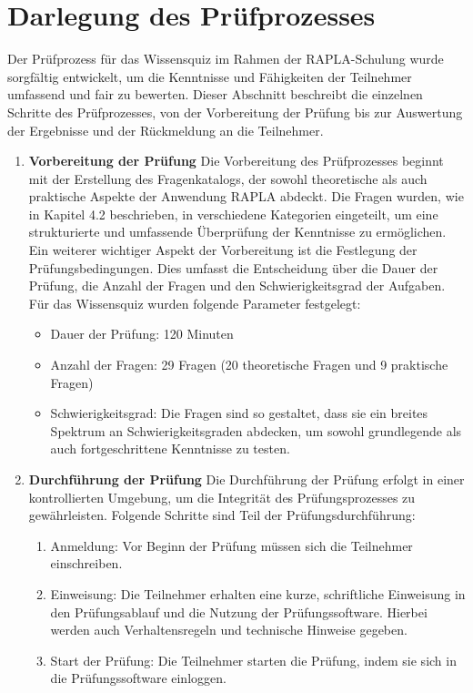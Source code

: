 \section{Darlegung des Prüfprozesses}
Der Prüfprozess für das Wissensquiz im Rahmen der RAPLA-Schulung wurde sorgfältig entwickelt, um die Kenntnisse und Fähigkeiten der Teilnehmer umfassend und fair zu bewerten. Dieser Abschnitt beschreibt die einzelnen Schritte des Prüfprozesses, von der Vorbereitung der Prüfung bis zur Auswertung der Ergebnisse und der Rückmeldung an die Teilnehmer.
\begin{enumerate}
    \item \textbf{Vorbereitung der Prüfung}
Die Vorbereitung des Prüfprozesses beginnt mit der Erstellung des Fragenkatalogs, der sowohl theoretische als auch praktische Aspekte der Anwendung RAPLA abdeckt. Die Fragen wurden, wie in Kapitel 4.2 beschrieben, in verschiedene Kategorien eingeteilt, um eine strukturierte und umfassende Überprüfung der Kenntnisse zu ermöglichen.
Ein weiterer wichtiger Aspekt der Vorbereitung ist die Festlegung der Prüfungsbedingungen. Dies umfasst die Entscheidung über die Dauer der Prüfung, die Anzahl der Fragen und den Schwierigkeitsgrad der Aufgaben. Für das Wissensquiz wurden folgende Parameter festgelegt:
    \begin{itemize}
        \item Dauer der Prüfung: 120 Minuten
        \item Anzahl der Fragen: 29 Fragen (20 theoretische Fragen und 9 praktische Fragen)
        \item Schwierigkeitsgrad: Die Fragen sind so gestaltet, dass sie ein breites Spektrum an Schwierigkeitsgraden abdecken, um sowohl grundlegende als auch fortgeschrittene Kenntnisse zu testen.
    \end{itemize}
    \item \textbf{Durchführung der Prüfung}
Die Durchführung der Prüfung erfolgt in einer kontrollierten Umgebung, um die Integrität des Prüfungsprozesses zu gewährleisten. Folgende Schritte sind Teil der Prüfungsdurchführung:
    \begin{enumerate}
        \item Anmeldung: Vor Beginn der Prüfung müssen sich die Teilnehmer einschreiben.
        \item Einweisung: Die Teilnehmer erhalten eine kurze, schriftliche Einweisung in den Prüfungsablauf und die Nutzung der Prüfungssoftware. Hierbei werden auch Verhaltensregeln und technische Hinweise gegeben.
        \item Start der Prüfung: Die Teilnehmer starten die Prüfung, indem sie sich in die Prüfungssoftware einloggen. 

\end{enumerate}
\end{enumerate}

